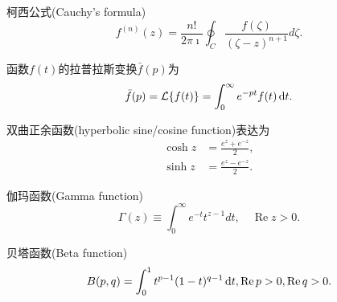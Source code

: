 \documentclass{njustexam}
\begin{document}
\vfill
\newpage
{} %
柯西公式(Cauchy's formula)
\begin{equation*}
  f^{(n)}(z) = \frac{n!}{2\pi \imath} \oint_C \frac{f(\zeta)}{(\zeta - z)^{n+1}} d \zeta. 
  \label{eq:cauchy_formula_nth_derivative}
\end{equation*}

\bigskip
函数$f(t)$的拉普拉斯变换$\bar{f}(p)$为
\begin{equation*}
    \bar{f}(p) = \mathcal{L} \{ f(t) \} = \int_0 ^{\infty} e^{-pt} f(t) \mathop{}\!\mathrm{d} t . 
\end{equation*}

\bigskip

双曲正余函数(hyperbolic sine/cosine function)表达为
\begin{align*}
    \cosh z&= \frac{e^{z} + e^{ - z} }{2} , 
    \\
    \sinh z &= \frac{e^{z} - e^{ - z} }{2} . 
\end{align*}

伽玛函数(Gamma function)
\begin{equation*}
  \Gamma(z) \equiv \int_{0}^{\infty} e^{-t} t^{z-1} d t,  \quad \operatorname{Re} z>0 . 
\end{equation*}
\bigskip

贝塔函数(Beta function)
\begin{equation*}
    B(p,  q) = \int_0^1 t^{p -1} (1-t)^{q-1} \mathop{}\!\mathrm{d} t,  \operatorname{Re} p> 0,  \operatorname{Re} q >0. 
    \label{eq:beta_def1}
\end{equation*}
\bigskip


\end{document}
